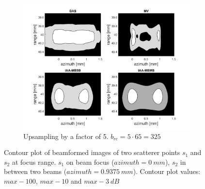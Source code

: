\begin{figure}[ht]
    \quad
    \begin{subfigure}[t]{0.48\linewidth}
        \includegraphics[width=\linewidth]{./images/discussion/all-time5.png}
        \caption{Upsampling by a factor of 5. $b_{re} = 5 \cdot 65 =  325$}
    \end{subfigure}
\caption{Contour plot of beamformed images of two scatterer points $s_1$ and $s_2$ at focus range. $s_1$ on beam focus ($azimuth = 0~mm$), $s_2$ in between two beams ($azimuth = 0.9375~mm$). Contour plot values: $max-100$, $max-10$ and $max-3~dB$}
\label{fig:time_upsampling}
\end{figure}




